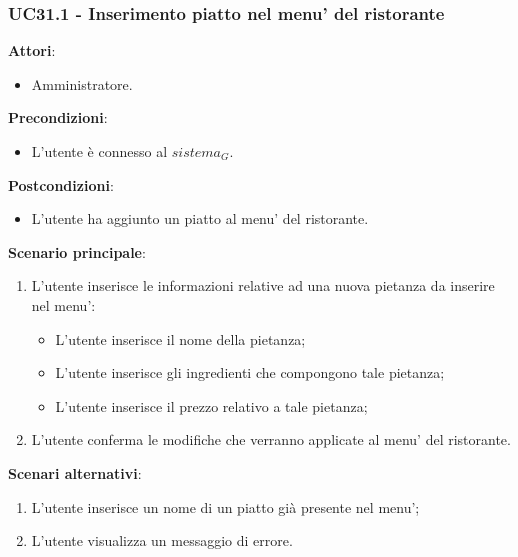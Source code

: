 \newpage
\subsubsection{UC31.1 - Inserimento piatto nel menu' del ristorante}\label{usecase:31_1}
\textbf{Attori}:
\begin{itemize}
    \item Amministratore.
\end{itemize}
\textbf{Precondizioni}:
\begin{itemize}
    \item L'utente è connesso al $\textit{sistema}_G$.
\end{itemize}
\textbf{Postcondizioni}:
\begin{itemize}
    \item L’utente ha aggiunto un piatto al menu’ del ristorante.
\end{itemize}
\textbf{Scenario principale}:
\begin{enumerate}
    \item L'utente inserisce le informazioni relative ad una nuova pietanza da inserire nel menu':
    \begin{itemize}
        \item L'utente inserisce il nome della pietanza;
        \item L'utente inserisce gli ingredienti che compongono tale pietanza;
        \item L'utente inserisce il prezzo relativo a tale pietanza;
    \end{itemize}
    \item L'utente conferma le modifiche che verranno applicate al menu' del ristorante.
\end{enumerate}
\textbf{Scenari alternativi}: 
\begin{enumerate}
    \item L'utente inserisce un nome di un piatto già presente nel menu';
    \item L'utente visualizza un messaggio di errore.
\end{enumerate}